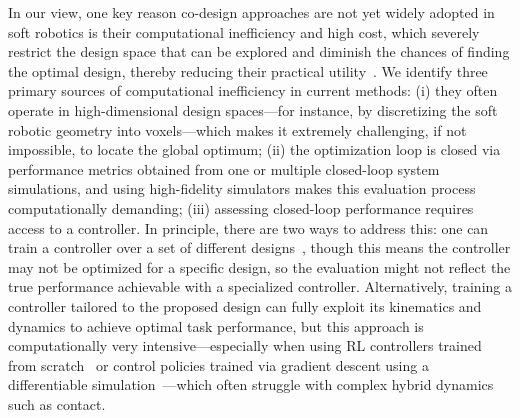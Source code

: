 In our view, one key reason co-design approaches are not yet widely adopted in soft robotics is their computational inefficiency and high cost, which severely restrict the design space that can be explored and diminish the chances of finding the optimal design, thereby reducing their practical utility~\citep{chen2020design}. We identify three primary sources of computational inefficiency in current methods: (i) they often operate in high-dimensional design spaces—for instance, by discretizing the soft robotic geometry into voxels—which makes it extremely challenging, if not impossible, to locate the global optimum; (ii) the optimization loop is closed via performance metrics obtained from one or multiple closed-loop system simulations, and using high-fidelity simulators makes this evaluation process computationally demanding; (iii) assessing closed-loop performance requires access to a controller. In principle, there are two ways to address this: one can train a controller over a set of different designs~\citep{zardini2021seeking, boekel2025learning}, though this means the controller may not be optimized for a specific design, so the evaluation might not reflect the true performance achievable with a specialized controller. Alternatively, training a controller tailored to the proposed design can fully exploit its kinematics and dynamics to achieve optimal task performance, but this approach is computationally very intensive—especially when using \gls{RL} controllers trained from scratch~\citep{bhatia2021evolution, wang2022curriculum, wang2023softzoo, wang2023preco} or control policies trained via gradient descent using a differentiable simulation~\citep{spielberg2019learning, wang2023softzoo, wang2024diffusebot}—which often struggle with complex hybrid dynamics such as contact.

